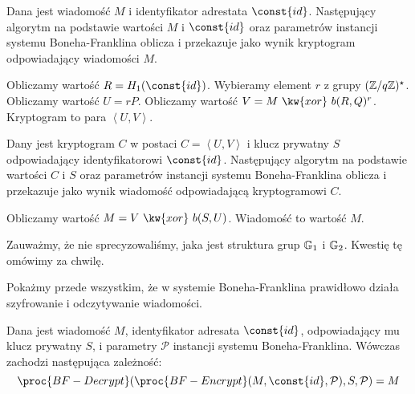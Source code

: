 \begin{algorithm}
Dana jest wiadomość $M$ i identyfikator adrestata $\const{id}$.
Następujący algorytm na podstawie wartości $M$ i $\const{id}$
oraz parametrów instancji systemu Boneha-Franklina
oblicza i przekazuje jako wynik
kryptogram odpowiadający wiadomości $M$.

\begin{codebox}
\li
Obliczamy wartość $R = H_1(\const{id})$.
\li
Wybieramy element $r$ z grupy $(\mathbb{Z} / q\mathbb{Z})^\star$.
\li
Obliczamy wartość $U = rP$.
\li
Obliczamy wartość $V = M\ \kw{xor}\ b(R, Q)^r$.
\li
Kryptogram to para
$\left\langle U, V \right\rangle$.
\end{codebox}
\end{algorithm}

\begin{algorithm}
Dany jest kryptogram $C$ w postaci $C = \left\langle U, V \right\rangle$
i klucz prywatny $S$ odpowiadający identyfikatorowi $\const{id}$.
Następujący algorytm
na podstawie wartości $C$ i $S$
oraz parametrów instancji systemu Boneha-Franklina
oblicza i przekazuje jako wynik
wiadomość odpowiadającą kryptogramowi $C$.

\begin{codebox}
\li
Obliczamy wartość $M = V\ \kw{xor}\ b(S, U)$.
\li
Wiadomość to wartość $M$.
\end{codebox}
\end{algorithm}

\begin{remark}
Zauważmy, że nie sprecyzowaliśmy, jaka jest struktura grup $\mathbb{G}_1$ i $\mathbb{G}_2$.
Kwestię tę omówimy za chwilę.
\end{remark}

Pokażmy przede wszystkim, że w systemie Boneha-Franklina
prawidłowo działa szyfrowanie i odczytywanie wiadomości.

\begin{theorem}
Dana jest wiadomość $M$,
identyfikator adresata $\const{id}$,
odpowiadający mu klucz prywatny $S$,
i parametry $\mathcal{P}$ instancji systemu Boneha-Franklina.
Wówczas zachodzi następująca zależność:
\begin{equation*}
\proc{BF-Decrypt}(
    \proc{BF-Encrypt}(
        M,
        \const{id},
        \mathcal{P}
    ),
    S,
    \mathcal{P}
) = M
\end{equation*}
\end{theorem}


